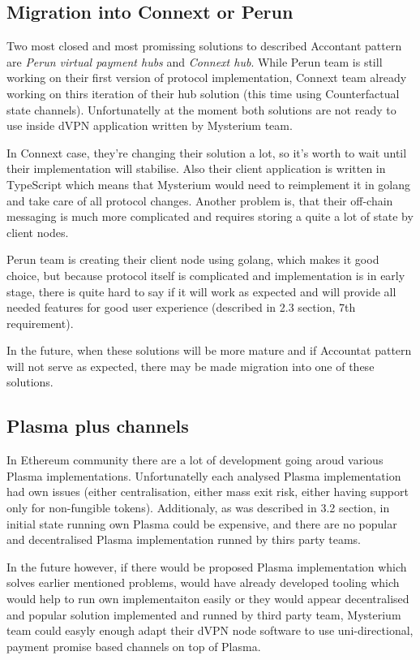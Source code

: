 \documentclass[a4paper,12pt]{article}
\begin{document}
\subsection{Migration into Connext or Perun}

Two most closed and most promissing solutions to described Accontant pattern are
\textit{Perun virtual payment hubs} and \textit{Connext hub}. While Perun team 
is still working on their first version of protocol implementation, Connext team 
already working on thirs iteration of their hub solution (this time using 
Counterfactual state channels). Unfortunatelly at the moment both solutions are
not ready to use inside dVPN application written by Mysterium team. 

In Connext case, they're changing their solution a lot, so it's worth to wait 
until their implementation will stabilise. Also their client application is 
written in TypeScript which means that Mysterium would need to reimplement it 
in golang and take care of all protocol changes. Another problem is, that their
off-chain messaging is much more complicated and requires storing a quite a lot
of state by client nodes.

Perun team is creating their client node using golang, which makes it good
choice, but because protocol itself is complicated and implementation is in 
early stage, there is quite hard to say if it will work as expected and will
provide all needed features for good user experience (described in 2.3 section, 
7th requirement).

In the future, when these solutions will be more mature and if Accountat pattern
will not serve as expected, there may be made migration into one of these 
solutions.

\subsection{Plasma plus channels}

In Ethereum community there are a lot of development going aroud various Plasma 
implementations. Unfortunatelly each analysed Plasma implementation had own 
issues (either centralisation, either mass exit risk, either having support only
for non-fungible tokens). Additionaly, as was described in 3.2 section, in 
initial state running own Plasma could be expensive, and there are no popular
and decentralised Plasma implementation runned by thirs party teams.

In the future however, if there would be proposed Plasma implementation which
solves earlier mentioned problems, would have already developed tooling which
would help to run own implementaiton easily or they would appear decentralised
and popular solution implemented and runned by third party team, Mysterium team 
could easyly enough adapt their dVPN node software to use uni-directional, 
payment promise based channels on top of Plasma.
\end{document}
